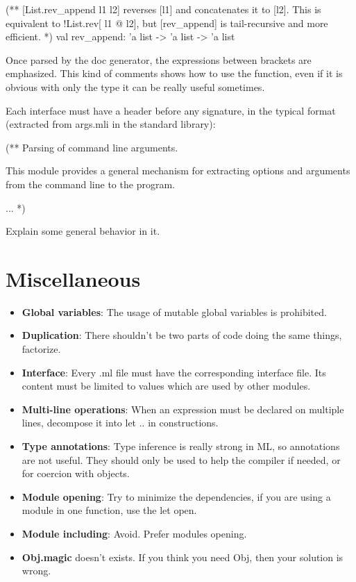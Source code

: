 \documentclass[12pt,a4paper]{article}
\begin{document}
\begin{OCaml}
(** [List.rev_append l1 l2] reverses [l1] and concatenates it to [l2].
    This is equivalent to {!List.rev}[ l1 @ l2], but [rev_append] is tail-recursive and more efficient. *)
val rev_append: 'a list -> 'a list -> 'a list
\end{OCaml}

Once parsed by the doc generator, the expressions between brackets are
emphasized. This kind of comments shows how to use the function, even if it is
obvious with only the type it can be really useful sometimes.

Each interface must have a header before any signature, in the typical format
(extracted from args.mli in the standard library):
\begin{OCaml}
(** Parsing of command line arguments.

   This module provides a general mechanism for extracting options and
   arguments from the command line to the program.

   ...
*)
\end{OCaml}

Explain some general behavior in it.

\section{Miscellaneous}

\begin{itemize}
\item \textbf{Global variables}: The usage of mutable global variables is
  prohibited.
\item \textbf{Duplication}: There shouldn't be two parts of code doing the same
  things, factorize.
\item \textbf{Interface}: Every .ml file must have the corresponding interface
  file. Its content must be limited to values which are used by other
  modules. 
\item \textbf{Multi-line operations}: When an expression must be declared on
  multiple lines, decompose it into \textsf{let .. in} constructions.
\item \textbf{Type annotations}: Type inference is really strong in ML, so
  annotations are not useful. They should only be used to help the compiler if
  needed, or for coercion with objects.
\item \textbf{Module opening}: Try to minimize the dependencies, if you are
  using a module in one function, use the let open.
\item \textbf{Module including}: Avoid. Prefer modules opening.
\item \textbf{Obj.magic} doesn't exists. If you think you need \textsf{Obj},
  then your solution is wrong.
\end{itemize}
\end{document}

